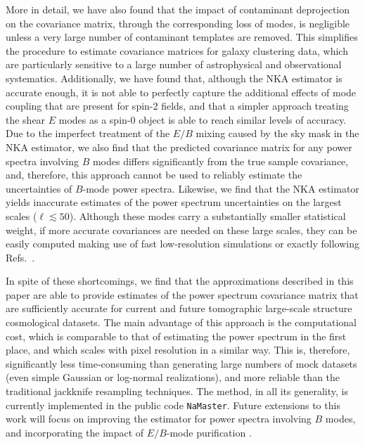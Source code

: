 \documentclass[a4paper,11pt]{article}
\newcommand{\cgg}[1]{{\color{olive} #1}}
\begin{document}
    More in detail, we have also found that the impact of contaminant
    deprojection on the covariance matrix, through the corresponding loss of
    modes, is negligible unless a very large number of contaminant templates
    are removed. This simplifies the procedure to estimate covariance matrices
    for galaxy clustering data, which are particularly sensitive to a large
    number of astrophysical and observational systematics. Additionally, we
    have found that, although the NKA estimator is accurate enough, it is not
    able to perfectly capture the additional effects of mode coupling that are
    present for spin-2 fields, and that a simpler approach treating the shear
    $E$ modes as a spin-0 object is able to reach similar levels of accuracy.
    Due to the imperfect treatment of the $E/B$ mixing caused by the sky mask
    in the NKA estimator, we also find that the predicted covariance matrix
    for any power spectra involving $B$ modes differs significantly from the
    true sample covariance, and, therefore, this approach cannot be used to
    reliably estimate the uncertainties of $B$-mode power spectra. Likewise,
    we find that the NKA estimator yields inaccurate estimates of the power
    spectrum uncertainties on the largest scales ($\ell\lesssim50$). Although
    these modes carry a substantially smaller statistical weight, if more
    accurate covariances are needed on these large scales, they can be easily
    computed making use of fast low-resolution simulations \cgg{or exactly
    following Refs.~\cite{Efstathiou:2006eb,2017A&A...602A..41C}}.
    
    In spite of these shortcomings, we find that the approximations described in this paper are able to provide estimates of the power spectrum covariance matrix that are sufficiently accurate for current and future tomographic large-scale structure cosmological datasets. The main advantage of this approach is the computational cost, which is comparable to that of estimating the power spectrum in the first place, and which  scales with pixel resolution in a similar way. This is, therefore, significantly less time-consuming than generating large numbers of mock datasets (even simple Gaussian or log-normal realizations), and more reliable than the traditional jackknife resampling techniques. The method, in all its generality, is currently implemented in the public code {\tt NaMaster}. Future extensions to this work will focus on improving the estimator for power spectra involving $B$ modes, and incorporating the impact of $E/B$-mode purification \cite{2002PhRvD..65b3505L,2003PhRvD..67b3501B,2006PhRvD..74h3002S}.
    
\end{document}
